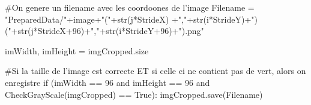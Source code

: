 \documentclass[a4paper, 12pt, titlepage, oneside, french]{article}
\begin{document}
\begin{spverbatim}
	    #On genere un filename avec les coordoones de l'image
            Filename = "PreparedData/"+image+"("+str(j*StrideX)
	    +","+str(i*StrideY)+")("+str(j*StrideX+96)+","+str(i*StrideY+96)+").png" 
            
	    imWidth, imHeight = imgCropped.size
            
	    #Si la taille de l'image est correcte ET si celle ci ne contient pas de vert, alors on enregistre
	    if (imWidth == 96 and imHeight == 96 and CheckGrayScale(imgCropped) == True):
                imgCropped.save(Filename)

\end{spverbatim}


\medskip
\newpage
\printbibliography[heading=bibintoc]
\end{document}
